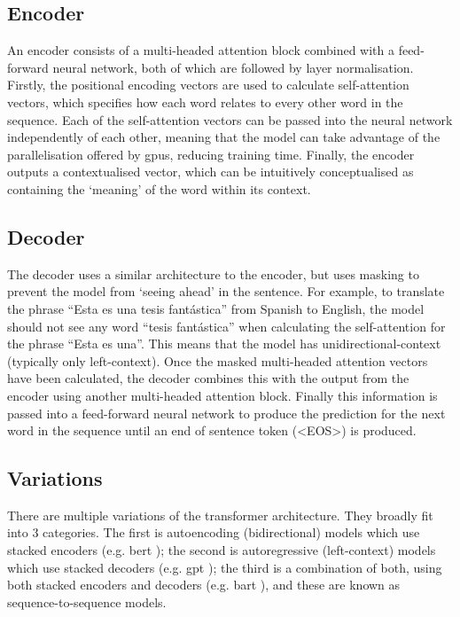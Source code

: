 \subsection{Encoder}
An encoder consists of a multi-headed attention block combined with a feed-forward neural network, both of which are followed by layer normalisation. Firstly, the positional encoding vectors are used to calculate self-attention vectors, which specifies how each word relates to every other word in the sequence. Each of the self-attention vectors can be passed into the neural network independently of each other, meaning that the model can take advantage of the parallelisation offered by \acrshort{gpu}s, reducing training time. Finally, the encoder outputs a contextualised vector, which can be intuitively conceptualised as containing the `meaning' of the word within its context.

\subsection{Decoder}
The decoder uses a similar architecture to the encoder, but uses masking to prevent the model from `seeing ahead' in the sentence. For example, to translate the phrase ``Esta es una tesis fantástica'' from Spanish to English, the model should not see any word ``tesis fantástica'' when calculating the self-attention for the phrase ``Esta es una''. This means that the model has unidirectional-context (typically only left-context). Once the masked multi-headed attention vectors have been calculated, the decoder combines this with the output from the encoder using another multi-headed attention block. Finally this information is passed into a feed-forward neural network to produce the prediction for the next word in the sequence until an end of sentence token (<EOS>) is produced.

\subsection{Variations}
There are multiple variations of the transformer architecture.
They broadly fit into 3 categories. The first is autoencoding (bidirectional) models which use stacked encoders (e.g. \acrshort{bert} \citep{devlin2019bert}); the second is autoregressive (left-context) models which use stacked decoders (e.g. \acrshort{gpt} \citep{radford2018improving}); the third is a combination of both, using both stacked encoders and decoders (e.g. \acrshort{bart} \citep{lewis2019bart}), and these are known as sequence-to-sequence models. %

